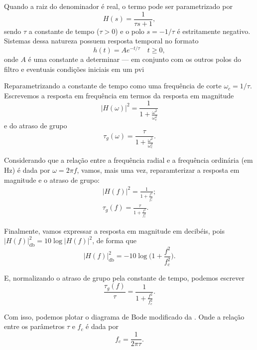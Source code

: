 Quando a raiz do denominador é real, o termo pode ser parametrizado por
 \begin{equation}
	 H(s)=\frac{1}{\tau s+1},
 \end{equation}
sendo $\tau$ a constante de tempo ($\tau>0$) e o polo $s=-1\slash\tau$ é estritamente negativo. Sistemas dessa natureza possuem resposta temporal no formato
 \begin{equation}
	 h(t)=Ae^{-t\slash\tau}\quad t\geq0,
 \end{equation}
onde $A$ é uma constante a determinar --- em conjunto com os outros polos do filtro e eventuais condições iniciais em um \ac{pvi}

Reparametrizando a constante de tempo como uma frequência de corte $\omega_c=1\slash\tau$. Escrevemos a resposta em frequência em termos da resposta em magnitude
\begin{equation}
	|H(\omega)|^2=\frac{1}{\displaystyle1+\frac{\omega^2}{\omega_c^2}}
\end{equation}
e do atraso de grupo
\begin{equation}
	\tau_g(\omega)=\frac{\tau}{\displaystyle1+\frac{\omega^2}{\omega_c^2}}.
\end{equation}

Considerando que a relação entre a frequência radial e a frequência ordinária (em \unit{\hertz}) é dada por $\omega=2\pi f$, vamos, mais uma vez, reparamterizar a resposta em magnitude e o atraso de grupo:
\begin{gather}
	|H(f)|^2=\frac{1}{\displaystyle1+\frac{f^2}{f_c^2}};\\
	\tau_g(f)=\frac{\tau}{\displaystyle1+\frac{f^2}{f_c^2}}.
\end{gather}

Finalmente, vamos expressar a resposta em magnitude em decibéis, pois $|H(f)|_{\unit{\decibel}}^2=10\log|H(f)|^2$, de forma que
\begin{equation}
	|H(f)|_{\unit{\decibel}}^2=-10\log\Big(1+\frac{f^2}{f_c^2}\Big).
\end{equation}

E, normalizando o atraso de grupo pela constante de tempo, podemos escrever
\begin{equation}
	\frac{\tau_g(f)}{\tau}=\frac{1}{\displaystyle1+\frac{f^2}{f_c^2}}.
\end{equation}

Com isso, podemos plotar o diagrama de Bode modificado da . Onde a relação entre os parâmetros $\tau$ e $f_c$ é dada por
\begin{equation}
	f_c=\frac{1}{2\pi\tau}.
\end{equation}

